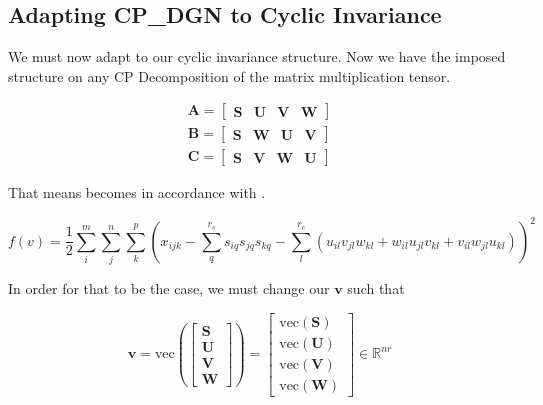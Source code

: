 \newpage
\subsection{Adapting CP\_DGN to Cyclic Invariance} \label{Adapting CP-DGN to Cyclic Invariance}

    We must now adapt  to our cyclic invariance structure. Now we have the imposed
    structure on any CP Decomposition of the matrix multiplication tensor. 

    \begin{equation*}
        \begin{array}{rcl}
            \mathbf{A} = [\begin{array}{cccc} \mathbf S & \mathbf U & \mathbf V & \mathbf W \end{array}]\\
            \mathbf{B} = [\begin{array}{cccc} \mathbf S & \mathbf W & \mathbf U & \mathbf V \end{array}]\\
            \mathbf{C} = [\begin{array}{cccc} \mathbf S & \mathbf V & \mathbf W & \mathbf U \end{array}]
        \end{array}
    \end{equation*}

    That means  becomes 
    in accordance with . 

    \begin{equation} \label{eq:ci_cp_least_squares}
        f(v) = \frac{1}{2} \sum_{i}^m \sum_{j}^n \sum_{k}^p \left( x_{ijk} - \sum_{q}^{r_s} s_{iq}s_{jq}s_{kq} - \sum_{l}^{r_c} (u_{il}v_{jl}w_{kl} + w_{il}u_{jl}v_{kl} + v_{il}w_{jl}u_{kl}) \right)^2
    \end{equation}

    In order for that to be the case, we must change our $\mathbf{v}$ such that

    \begin{equation*}
        \mathbf{v} = \text{vec}
        \left(
        \left[
            \begin{array}{c}
                \mathbf{S} \\
                \mathbf{U} \\
                \mathbf{V} \\
                \mathbf{W}
            \end{array}
        \right]
        \right) = 
        \left[
            \begin{array}{c}
                \text{vec}(\mathbf{S}) \\
                \text{vec}(\mathbf{U}) \\
                \text{vec}(\mathbf{V}) \\
                \text{vec}(\mathbf{W})
            \end{array}
        \right]
        \in \mathbb{R}^{nr}
    \end{equation*}

